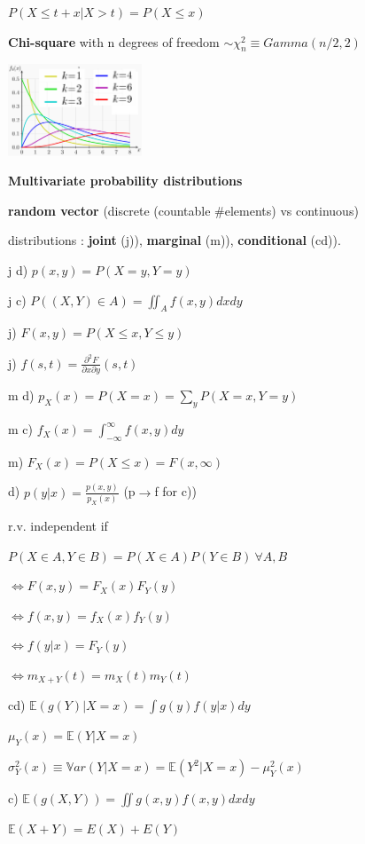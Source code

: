 \documentclass[a4paper,10.5pt]{article}
\begin{document}
\begin{multicols}{4}
		$P(X\leq t+x | X>t) = P(X\leq x)$
		
		\textbf{Chi-square} with n degrees of freedom $\sim \chi_n^2 \equiv Gamma(n/2,2)$
		
		\includegraphics[width=4cm]{img/chi.PNG}
		
		\textbf{Multivariate probability distributions}
		
		\textbf{random vector} (discrete (countable \#elements) vs continuous)
		
		distributions : \textbf{joint} (j)), \textbf{marginal} (m)), \textbf{conditional} (cd)).
		
		j d) $p(x,y) = P(X=y, Y=y)$
		
		j c) $P((X,Y)\in A) = \iint_A f(x,y) dx dy$
		
		j) $F(x,y) = P(X\leq x,Y\leq y)$
		
		j) $f(s,t) = \frac{\partial^2F}{\partial x\partial y}(s,t)$
		
		m d) $p_X(x) = P(X=x) = \sum_y P(X=x, Y=y)$
		
		m c) $f_X(x) = \int_{-\infty}^\infty f(x,y)dy$
		
		m) $F_X(x) = P(X \leq x) = F(x,\infty)$
		
		d) $p(y|x) = \frac{p(x,y)}{p_X(x)}$ (p$\to$f for c))
		
		r.v. independent if 
		
		$P(X\in A, Y\in B) = P(X\in A) P(Y\in B) \ \forall A, B$
		
		$\Leftrightarrow F(x,y) = F_X(x)F_Y(y)$
		
		$\Leftrightarrow f(x,y) = f_X(x)f_Y(y)$
		
		$\Leftrightarrow f(y|x) = F_Y(y)$
		
		$\Leftrightarrow m_{X+Y}(t) = m_X(t)m_Y(t)$
		
		cd) $\mathbb{E}(g(Y)|X=x) = \int g(y) f(y|x) dy$
		
		$\mu_Y(x) = \mathbb{E}(Y|X=x)$
		
		$\sigma_Y^2(x) \equiv \mathbb{V}ar(Y|X=x) = \mathbb{E}(Y^2|X = x) - \mu_Y^2(x)$
		
		c) $\mathbb{E}(g(X,Y)) = \iint g(x,y)f(x,y)dxdy$
		
		$\mathbb{E}(X+Y) = E(X) + E(Y)$
		

\end{multicols}
\end{document}
